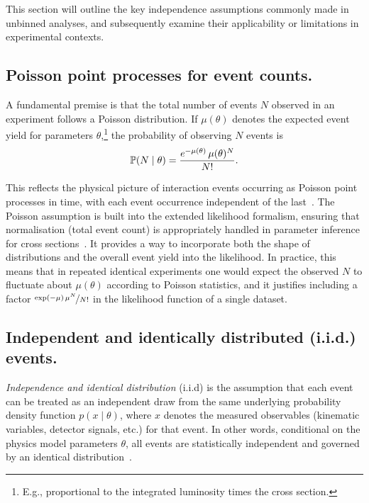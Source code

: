     This section will outline the key independence assumptions commonly made in unbinned analyses, and subsequently examine their applicability or limitations in experimental contexts.
    \subsection{Poisson point processes for event counts.}
        A fundamental premise is that the total number of events $N$ observed in an experiment follows a Poisson distribution.
        If $\mu(\theta)$ denotes the expected event yield for parameters $\theta$,\footnote{E.g., proportional to the integrated luminosity times the cross section.} the probability of observing $N$ events is
        \[
            \P( N\mid\theta) = \frac{e^{-\mu(\theta)}\,\mu(\theta)^N}{N!}.\]
            
        This reflects the physical picture of interaction events occurring as Poisson point processes in time, with each event occurrence independent of the last~\cite{cowan_statistical_1998, Kuusela2015StatisticalQuantification}.
        The Poisson assumption is built into the extended likelihood formalism, ensuring that normalisation (total event count) is appropriately handled in parameter inference for cross sections~\cite{Frate:2017mai, ParticleDataGroup:2018ovx}.
        It provides a way to incorporate both the shape of distributions and the overall event yield into the likelihood.
        In practice, this means that in repeated identical experiments one would expect the observed $N$ to fluctuate about $\mu(\theta)$ according to Poisson statistics, and it justifies including a factor \(\nicefrac{\exp(-\mu)\,\mu^N}{N!}\) in the likelihood function of a single dataset.
    
    \subsection{Independent and identically distributed (i.i.d.) events.}
        \begin{definition}[i.i.d.]
            \emph{Independence and identical distribution} (i.i.d) is the assumption that each event can be treated as an independent draw from the same underlying probability density function $p(x\mid\theta)$, where $x$ denotes the measured observables (kinematic variables, detector signals, etc.) for that event.
            In other words, conditional on the physics model parameters $\theta$, all events are statistically independent and governed by an identical distribution~\cite{Nachman2021EOnce, ParticleDataGroup:2022pth, cowan_statistical_1998, Stakia:2021pvp}.
        \end{definition}
        
